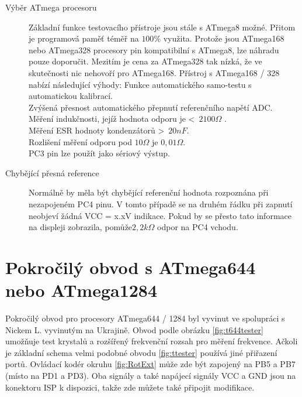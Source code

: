 \begin{description}
\vspace{-0.3cm}
\item[Výběr ATmega procesoru]
Základní funkce testovacího přístroje jsou stále s ATmega8 možné.
Přitom je programová paměť téměř na  \(100\%\) využita.
Protože jsou ATmega168 nebo ATmega328 procesory pin kompatibilní s ATmega8,
lze náhradu pouze doporučit. Mezitím  je cena za ATmega328 tak nízká, že ve skutečnosti nic
nehovoří pro ATmega168.
Přístroj s ATmega168 / 328 nabízí následující výhody:
Funkce automatického samo-testu s automatickou kalibrací.\\
Zvýšená přesnost automatického přepnutí referenčního napětí ADC.\\
Měření indukčnosti, jejíž hodnota odporu je  \textless~\(2100\Omega\) .\\
Měření ESR hodnoty kondenzátorů \textgreater~\(20nF\).\\
Rozlišení měření odporu pod \(10\Omega\) je \(0,01\Omega\).\\
PC3 pin lze použít jako sériový výstup.
\vspace{-0.3cm}
\item[Chybějící přesná reference]
Normálně by měla být chybějící referenční hodnota rozpoznána při nezapojeném PC4 pinu.
V tomto případě se na druhém řádku při zapnutí neobjeví žádná VCC = x.xV indikace.
Pokud by se přesto tato informace na displeji zobrazila, pomůže\(2,2k\Omega\) odpor na PC4 vchodu.
\end{description}

\vspace{-0.8cm}
\section{Pokročilý obvod s ATmega644 nebo ATmega1284}
\vspace{-0.3cm}
Pokročilý obvod pro procesory ATmega644 / 1284 byl vyvinut ve spolupráci s Nickem L.
vyvinutým na Ukrajině. Obvod podle obrázku \ref{fig:t644tester} umožňuje test krystalů a rozšířený frekvenční rozsah pro měření frekvence. Ačkoli je základní schema velmi podobné obvodu  \ref{fig:ttester} používá jiné přiřazení portů.
Ovládací kodér okruhu \ref{fig:RotExt} může zde být zapojený na PB5 a PB7 (místo na PD1 a PD3). 
Oba signály a také napájecí signály VCC a GND jsou na konektoru ISP k dispozici,
takže zde můžete také připojit modifikace.

